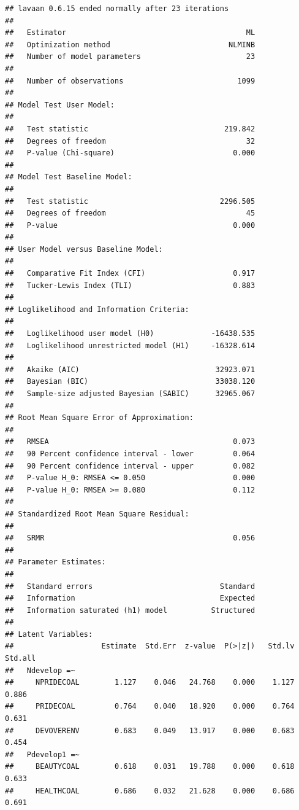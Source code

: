 \documentclass[
]{article}
\begin{document}
\begin{verbatim}
## lavaan 0.6.15 ended normally after 23 iterations
## 
##   Estimator                                         ML
##   Optimization method                           NLMINB
##   Number of model parameters                        23
## 
##   Number of observations                          1099
## 
## Model Test User Model:
##                                                       
##   Test statistic                               219.842
##   Degrees of freedom                                32
##   P-value (Chi-square)                           0.000
## 
## Model Test Baseline Model:
## 
##   Test statistic                              2296.505
##   Degrees of freedom                                45
##   P-value                                        0.000
## 
## User Model versus Baseline Model:
## 
##   Comparative Fit Index (CFI)                    0.917
##   Tucker-Lewis Index (TLI)                       0.883
## 
## Loglikelihood and Information Criteria:
## 
##   Loglikelihood user model (H0)             -16438.535
##   Loglikelihood unrestricted model (H1)     -16328.614
##                                                       
##   Akaike (AIC)                               32923.071
##   Bayesian (BIC)                             33038.120
##   Sample-size adjusted Bayesian (SABIC)      32965.067
## 
## Root Mean Square Error of Approximation:
## 
##   RMSEA                                          0.073
##   90 Percent confidence interval - lower         0.064
##   90 Percent confidence interval - upper         0.082
##   P-value H_0: RMSEA <= 0.050                    0.000
##   P-value H_0: RMSEA >= 0.080                    0.112
## 
## Standardized Root Mean Square Residual:
## 
##   SRMR                                           0.056
## 
## Parameter Estimates:
## 
##   Standard errors                             Standard
##   Information                                 Expected
##   Information saturated (h1) model          Structured
## 
## Latent Variables:
##                    Estimate  Std.Err  z-value  P(>|z|)   Std.lv  Std.all
##   Ndevelop =~                                                           
##     NPRIDECOAL        1.127    0.046   24.768    0.000    1.127    0.886
##     PRIDECOAL         0.764    0.040   18.920    0.000    0.764    0.631
##     DEVOVERENV        0.683    0.049   13.917    0.000    0.683    0.454
##   Pdevelop1 =~                                                          
##     BEAUTYCOAL        0.618    0.031   19.788    0.000    0.618    0.633
##     HEALTHCOAL        0.686    0.032   21.628    0.000    0.686    0.691

\end{verbatim}
\end{document}
